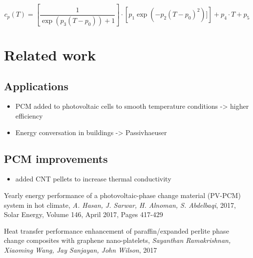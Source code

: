 \documentclass{scrartcl}[12pt, halfparskip]
\begin{document}
\begin{equation*}
	c_p(T) = \left[ \frac{1}{\exp(p_3(T-p_0)) + 1} \right] \cdot \left[ p_1 \exp(-p_2(T-p_0)^2)] \right] + p_4 \cdot T + p_5 
\end{equation*}

\section{Related work}
\subsection{Applications}
\begin{itemize}
	\item PCM added to photovoltaic cells to smooth temperature conditions -> higher efficiency \cite{pv-pcm}
	\item Energy conversation in buildings -> Passivhaeuser 
\end{itemize}

\subsection{PCM improvements}
\begin{itemize}
	\item added CNT pellets to increase thermal conductivity \cite{cnt_pellets}
\end{itemize}



\newpage
\begin{thebibliography}{9}

  
  Yearly energy performance of a photovoltaic-phase change material
  (PV-PCM) system in hot climate, 
  \textit{A. Hasan, J. Sarwar, H. Alnoman, S. Abdelbaqi},
  2017,
  Solar Energy, Volume 146, April 2017, Pages 417-429

   Heat transfer performance enhancement of paraffin/expanded
   perlite phase change composites with graphene nano-platelets,
   \textit{Sayanthan Ramakrishnan, Xiaoming Wang, Jay Sanjayan, John Wilson},
   2017
  
  
\end{thebibliography}
\end{document}
